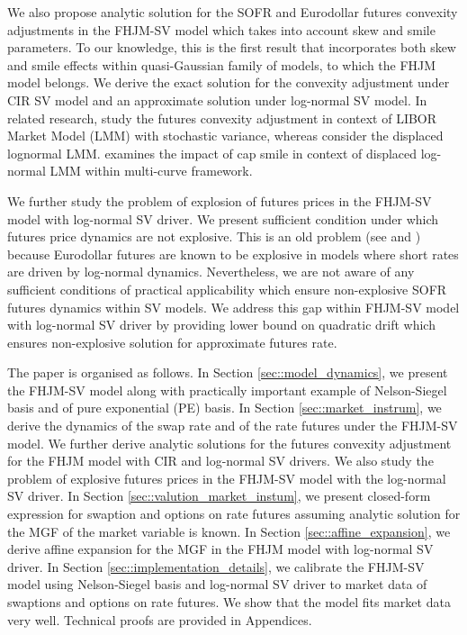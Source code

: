 \documentclass[pdftex,11pt,a4paper] {article}
\begin{document}
We also propose analytic solution for the SOFR and Eurodollar futures convexity adjustments in the FHJM-SV model which takes into account skew and smile parameters. To our knowledge, this is the first result that incorporates both skew and smile effects within quasi-Gaussian family of models, to which  the FHJM model belongs. We derive the exact solution for the convexity adjustment under CIR SV model and an approximate solution under log-normal SV model. In related research, \cite{Piterbarg2006} study the futures convexity adjustment in context of LIBOR Market Model (LMM) with stochastic variance, whereas \cite{Jackel2005} consider the displaced lognormal LMM. \cite{Mercurio2017} examines the impact of cap smile in context of displaced log-normal LMM within multi-curve framework. 

We further study the problem of explosion of futures prices in the FHJM-SV model with log-normal SV driver. We present sufficient condition under which futures price dynamics are not explosive. This is an old problem (see \cite{HoganWeintraub93} and \cite{Morton89}) because Eurodollar futures are known to be explosive in models where short rates are driven by log-normal dynamics. Nevertheless, we are not aware of any sufficient conditions of practical applicability which ensure non-explosive SOFR futures dynamics within SV models. We address  this gap within FHJM-SV model with log-normal SV driver by providing lower bound on quadratic drift which ensures non-explosive solution for approximate futures rate. 

The paper is organised as follows. In Section \ref{sec::model_dynamics}, we present the FHJM-SV model along with practically important example of Nelson-Siegel basis and of pure exponential (PE) basis. In Section \ref{sec::market_instrum}, we derive the dynamics of the swap rate and of the rate futures under the FHJM-SV model.  We further derive analytic solutions for the futures convexity adjustment for the FHJM model with CIR and log-normal SV drivers. We also study the problem of explosive futures prices in the FHJM-SV model with the log-normal SV driver. In Section \ref{sec::valution_market_instum}, we present closed-form expression for swaption and options on rate futures  assuming analytic solution for the MGF of the market variable is known. In Section \ref{sec::affine_expansion}, we derive affine expansion for the MGF in the FHJM model with log-normal SV driver. In Section \ref{sec::implementation_details}, we calibrate the FHJM-SV model using Nelson-Siegel basis and log-normal SV driver to market data of swaptions and options on rate futures. We show that the model fits market data very well. Technical proofs are provided in Appendices.
\end{document}
